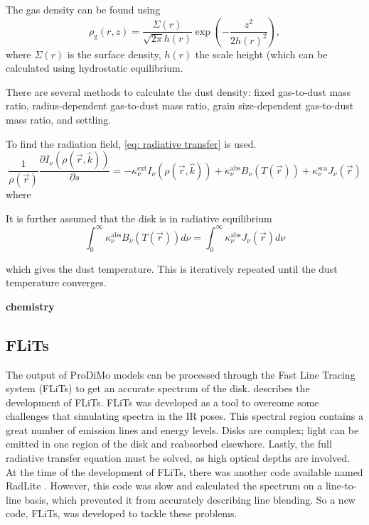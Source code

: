 \documentclass[oneside, single, authoryear, semicolon, 12pt]{lion-msc}
\renewcommand{\vec}[1] {\ensuremath{ \overrightarrow{ #1 } }}
\newcommand{\4}{$_4$}
\newcommand{\3}{$_3$}
\newcommand{\2}{$_2$}
\begin{document}
The gas density can be found using
\begin{equation}
    \rho_\mathrm{g}(r,z)=\frac{\Sigma(r)}{\sqrt{2\pi}h(r)}\exp{\left(-\frac{z^2}{2h(r)^2}\right)},
    \label{eq: density}
\end{equation}
where $\Sigma(r)$ is the surface density, $h(r)$ the scale height (which can be calculated using hydrostatic equilibrium. 

There are several methods to calculate the dust density: fixed gas-to-dust mass ratio, radius-dependent gas-to-dust mass ratio, grain size-dependent gas-to-dust mass ratio, and settling. 

To find the radiation field, \autoref{eq: radiative transfer} is used.
\begin{equation}
    \frac{1}{\rho(\vec{r})}\frac{\partial I_\nu(\rho(\vec{r}, \hat{k}))}{\partial s}=-\kappa^{\mathrm{ext}}_\nu I_\nu(\rho(\vec{r}, \hat{k})) + \kappa^{\mathrm{abs}}_\nu B_\nu(T(\vec{r})) + \kappa^{\mathrm{sca}}_\nu J_\nu(\vec{r})
    \label{eq: radiative transfer}
\end{equation}
where 

It is further assumed that the disk is in radiative equilibrium 
\begin{equation}
    \int^\infty_0\kappa^{\mathrm{abs}}_\nu B_\nu(T(\vec{r}))d\nu=\int^\infty_0\kappa^{\mathrm{abs}}_\nu J_\nu(\vec{r})d\nu
\end{equation}

which gives the dust temperature. This is iteratively repeated until the dust temperature converges.

\textbf{chemistry}

\subsection{FLiTs}
The output of ProDiMo models can be processed through the Fast Line Tracing system (FLiTs) to get an accurate spectrum of the disk. \cite{Woitke_2018} describes the development of FLiTs. FLiTs was developed as a tool to overcome some challenges that simulating spectra in the IR poses. This spectral region contains a great number of emission lines and energy levels. Disks are complex; light can be emitted in one region of the disk and reabsorbed elsewhere. Lastly, the full radiative transfer equation must be solved, as high optical depths are involved. At the time of the development of FLiTs, there was another code available named RadLite \citep{Pontoppidan_2009}. However, this code was slow and 
calculated the spectrum on a line-to-line basis, which prevented it from accurately describing line blending. So a new code, FLiTs, was developed to tackle these problems. 
\end{document}
